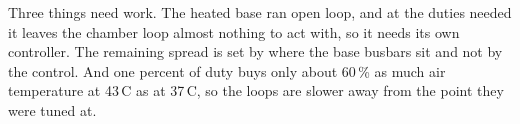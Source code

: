 Three things need work. The heated base ran open loop, and at the duties needed it leaves the chamber loop almost nothing to act with, so it needs its own controller. The remaining spread is set by where the base busbars sit and not by the control. And one percent of duty buys only about 60\,\% as much air temperature at 43\,\textdegree{}C as at 37\,\textdegree{}C, so the loops are slower away from the point they were tuned at.

